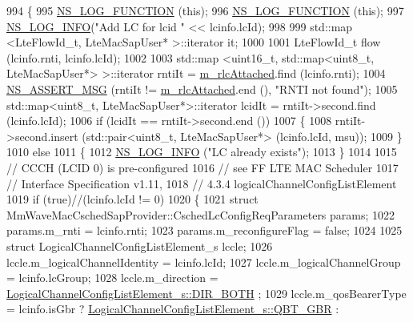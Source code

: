 \begin{DoxyCode}
994 \{
995   \hyperlink{log-macros-disabled_8h_a90b90d5bad1f39cb1b64923ea94c0761}{NS\_LOG\_FUNCTION} (\textcolor{keyword}{this});
996   \hyperlink{log-macros-disabled_8h_a90b90d5bad1f39cb1b64923ea94c0761}{NS\_LOG\_FUNCTION} (\textcolor{keyword}{this});
997   \hyperlink{group__logging_gafbd73ee2cf9f26b319f49086d8e860fb}{NS\_LOG\_INFO}(\textcolor{stringliteral}{"Add LC for lcid "} << lcinfo.lcId);
998 
999   std::map <LteFlowId\_t, LteMacSapUser* >::iterator it;
1000 
1001   LteFlowId\_t flow (lcinfo.rnti, lcinfo.lcId);
1002 
1003   std::map <uint16\_t, std::map<uint8\_t, LteMacSapUser*> >::iterator rntiIt = 
      \hyperlink{classns3_1_1MmWaveEnbMac_a13e4bafd30f3edae1f5dc1192c9b3011}{m\_rlcAttached}.find (lcinfo.rnti);
1004   \hyperlink{assert_8h_aff5ece9066c74e681e74999856f08539}{NS\_ASSERT\_MSG} (rntiIt != \hyperlink{classns3_1_1MmWaveEnbMac_a13e4bafd30f3edae1f5dc1192c9b3011}{m\_rlcAttached}.end (), \textcolor{stringliteral}{"RNTI not found"});
1005   std::map<uint8\_t, LteMacSapUser*>::iterator lcidIt = rntiIt->second.find (lcinfo.lcId);
1006   \textcolor{keywordflow}{if} (lcidIt == rntiIt->second.end ())
1007     \{
1008       rntiIt->second.insert (std::pair<uint8\_t, LteMacSapUser*> (lcinfo.lcId, msu));
1009     \}
1010   \textcolor{keywordflow}{else}
1011     \{
1012       \hyperlink{group__logging_gafbd73ee2cf9f26b319f49086d8e860fb}{NS\_LOG\_INFO} (\textcolor{stringliteral}{"LC already exists"});
1013     \}
1014 
1015   \textcolor{comment}{// CCCH (LCID 0) is pre-configured}
1016   \textcolor{comment}{// see FF LTE MAC Scheduler}
1017   \textcolor{comment}{// Interface Specification v1.11,}
1018   \textcolor{comment}{// 4.3.4 logicalChannelConfigListElement}
1019   \textcolor{keywordflow}{if} (\textcolor{keyword}{true})\textcolor{comment}{//(lcinfo.lcId != 0)}
1020   \{
1021         \textcolor{keyword}{struct }MmWaveMacCschedSapProvider::CschedLcConfigReqParameters params;
1022         params.m\_rnti = lcinfo.rnti;
1023         params.m\_reconfigureFlag = \textcolor{keyword}{false};
1024 
1025         \textcolor{keyword}{struct }LogicalChannelConfigListElement\_s lccle;
1026         lccle.m\_logicalChannelIdentity = lcinfo.lcId;
1027         lccle.m\_logicalChannelGroup = lcinfo.lcGroup;
1028         lccle.m\_direction = \hyperlink{structns3_1_1LogicalChannelConfigListElement__s_a0ce1e3a6af4d9a3e9fc19361d0af4e00abbf65338c16bef65cdedec87e8a7efaa}{LogicalChannelConfigListElement\_s::DIR\_BOTH}
      ;
1029         lccle.m\_qosBearerType = lcinfo.isGbr ? 
      \hyperlink{structns3_1_1LogicalChannelConfigListElement__s_a4b3d593978adeb6b101b9492d89aad3ea269c9a9e27278c110e664e9aa989bcf7}{LogicalChannelConfigListElement\_s::QBT\_GBR} : 

\end{DoxyCode}
